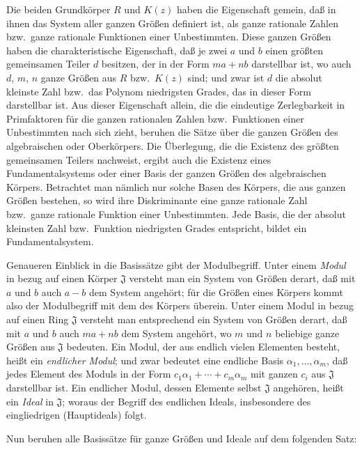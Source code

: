 \documentclass[12pt,a4paper]{article}
\begin{document}
Die beiden Grundk\"orper $R$ und $K(z)$ haben die Eigenschaft gemein, da\ss{} in ihnen das System aller ganzen Gr\"o\ss{}en definiert ist, als ganze rationale Zahlen bzw.\ ganze rationale Funktionen einer Unbestimmten. Diese ganzen Gr\"o\ss{}en haben die charakteristische Eigenschaft, da\ss{} je zwei $a$ und $b$ einen gr\"o\ss{}ten gemeinsamen Teiler $d$ besitzen, der in der Form $ma+nb$ darstellbar ist, wo auch $d$, $m$, $n$ ganze Gr\"o\ss{}en aus $R$ bzw.\ $K(z)$ sind; und zwar ist $d$ die absolut kleinste Zahl bzw.\ das Polynom niedrigsten Grades, das in dieser Form darstellbar ist. Aus dieser Eigenschaft allein, die die eindeutige Zerlegbarkeit in Primfaktoren f\"ur die ganzen rationalen Zahlen bzw.\ Funktionen einer Unbestimmten nach sich zieht, beruhen die S\"atze \"uber die ganzen Gr\"o\ss{}en des algebraischen oder Oberk\"orpers. Die \"Uberlegung, die die Existenz des gr\"o\ss{}ten gemeinsamen Teilers nachweist, ergibt auch die Existenz eines Fundamentalsystems oder einer Basis der ganzen Gr\"o\ss{}en des algebraischen K\"orpers. Betrachtet man n\"amlich nur solche Basen des K\"orpers, die aus ganzen Gr\"o\ss{}en bestehen, so wird ihre Diskriminante eine ganze rationale Zahl bzw.\ ganze rationale Funktion einer Unbestimmten. Jede Basis, die der absolut kleinsten Zahl bzw.\ Funktion niedrigsten Grades entspricht, bildet ein Fundamentalsystem.

Genaueren Einblick in die Basiss\"atze gibt der Modulbegriff. Unter einem \emph{Modul} in bezug auf einen K\"orper $\mathfrak{J}$ versteht man ein System von Gr\"o\ss{}en derart, da\ss{} mit $a$ und $b$ auch $a-b$ dem System angeh\"ort; f\"ur die Gr\"o\ss{}en eines K\"orpers kommt also der Modulbegriff mit dem des K\"orpers \"uberein. Unter einem Modul in bezug auf einen Ring $\mathfrak{J}$ versteht man entsprechend ein System von Gr\"o\ss{}en derart, da\ss{} mit $a$ und $b$ auch $ma+nb$ dem System angeh\"ort, wo $m$ und $n$ beliebige ganze Gr\"o\ss{}en aus $\mathfrak{J}$ bedeuten. Ein Modul, der aus endlich vielen Elementen besteht, hei\ss{}t ein \emph{endlicher Modul}; und zwar bedeutet eine endliche Basis $\alpha_{1},\ldots,\alpha_{m}$, da\ss{} jedes Element des Moduls in der Form $c_{1}\alpha_{1}+\cdots+c_{m}\alpha_{m}$ mit ganzen $c_{i}$ aus $\mathfrak{J}$ darstellbar ist. Ein endlicher Modul, dessen Elemente selbst $\mathfrak{J}$ angeh\"oren, hei\ss{}t ein \emph{Ideal} in $\mathfrak{J}$; woraus der Begriff des endlichen Ideals, insbesondere des eingliedrigen (Hauptideals) folgt.

Nun beruhen alle Basiss\"atze f\"ur ganze Gr\"o\ss{}en und Ideale auf dem folgenden Satz:
\end{document}
